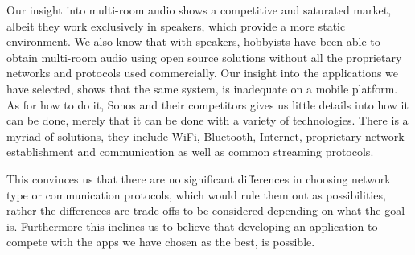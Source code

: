 \bigskip
Our insight into multi-room audio shows a competitive and saturated market, albeit they work exclusively in speakers, which provide a more static environment.
We also know that with speakers, hobbyists have been able to obtain multi-room audio using open source solutions without all the proprietary networks and protocols used commercially.
Our insight into the applications we have selected, shows that the same system, is inadequate on a mobile platform.
As for how to do it, Sonos and their competitors gives us little details into how it can be done, merely that it can be done with a variety of technologies.
There is a myriad of solutions, they include WiFi, Bluetooth, Internet, proprietary network establishment and communication as well as common streaming protocols.

This convinces us that there are no significant differences in choosing network type or communication protocols, which would rule them out as possibilities, rather the differences are trade-offs to be considered depending on what the goal is.
Furthermore this inclines us to believe that developing an application to compete with the apps we have chosen as the best, is possible.
